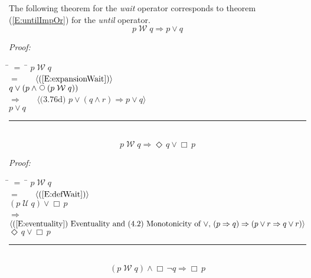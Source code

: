 \documentclass[fleqn, leqno]{article}
\newcommand{\lgap}{2pt}                             %
\newcommand{\mymathindent}{24pt}                    %
\newcommand{\impl}{\ensuremath{\Rightarrow}}        %
\newcommand{\Until}{\;\mathcal{U}\;}
\newcommand{\Wait}{\;\mathcal{W}\;}
\newcommand{\Next}{\;\,\text{\raisebox{3.5pt}{\circle{6}}}}
\newcommand{\Event}{\Diamond\,}
\newcommand{\Always}{\Box\,}
\newcommand{\myqed}{\hfill\rule[-.23ex]{1.2ex}{2.0ex}}
\newcommand{\Gll} {\langle}                         %
\newcommand{\Ggg} {\rangle}                         %
\newcommand{\Hint}[1]     {\ \ \ $\Gll              \mbox{#1} \Ggg$ }   %
\begin{document}
The following theorem for the \textit{wait} operator corresponds to theorem (\ref{E:untilImpOr}) for the \textit{until} operator.
\begin{equation}\label{E:waitToOr}
p \Wait q \impl p \lor q
\end{equation}

\emph{Proof:}
\begin{tabbing}
\hspace{\mymathindent} \= $= \;$ \= \kill
\> \> $p \Wait q$\\[\lgap]
\> $=$ \> \Hint{(\ref{E:expansionWait})} \\[\lgap]
\> \> $q \lor (p \land \Next(p \Wait q))$\\[\lgap]
\> $\impl$ \> \Hint{(3.76d) $p\lor (q\land r) \impl p\lor q$} \\[\lgap]
\> \> $p \lor q$\\[\lgap]
\end{tabbing}
\myqed\\[\lgap]


\begin{equation}\label{E:waitEntailment}
p \Wait q \impl \Event q \lor \Always p
\end{equation}

\emph{Proof:}
\begin{tabbing}
\hspace{\mymathindent} \= $= \;$ \= \kill
\> \> $p \Wait q$\\[\lgap]
\> $=$ \> \Hint{(\ref{E:defWait})} \\[\lgap]
\> \> $(p \Until q) \lor \Always p$\\[\lgap]
\> $\impl$ \> \Hint{(\ref{E:eventuality}) Eventuality and (4.2) Monotonicity of $\lor$, $(p\impl q) \impl (p\lor r \impl q\lor r)$} \\[\lgap]
\> \> $\Event q \lor \Always p$\\[\lgap]
\end{tabbing}
\myqed\\[\lgap]


\begin{equation}\label{E:waitEntailAlways}
(p \Wait q) \land \Always\neg q \impl \Always p
\end{equation}
\end{document}
